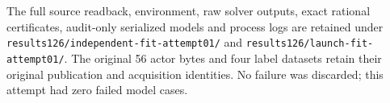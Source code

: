 The full source readback, environment, raw solver outputs, exact rational certificates, audit-only serialized models and process logs are retained under \nolinkurl{results126/independent-fit-attempt01/} and \nolinkurl{results126/launch-fit-attempt01/}. The original 56 actor bytes and four label datasets retain their original publication and acquisition identities. No failure was discarded; this attempt had zero failed model cases.
